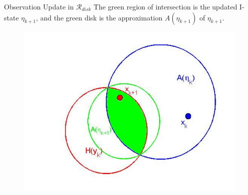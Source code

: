 \begin{frame}{Observation Update in $\mathcal{R}_{disk}$}
  The green region of intersection is the updated I-state $\eta_{k+1}$, and the
  green disk is the approximation $A(\eta_{k+1})$ of $\eta_{k+1}$.
			
    \begin{figure}
    \includegraphics[scale=0.3]{figs/circle3_2.jpg}
    \end{figure}
 
\end{frame}

